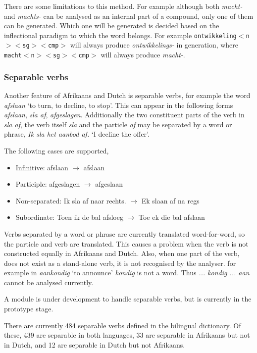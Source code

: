 \documentclass[11pt]{article}
\begin{document}
There are some limitations to this method. For example although
both {\em macht-} and {\em machts-} can be analysed as an internal part
of a compound, only one of them can be generated. Which one will be generated
is decided based on the inflectional paradigm to which the word belongs. For
example {\small {\tt ontwikkeling$<$n$><$sg$><$cmp$>$}} will always produce {\em ontwikkelings-} in generation,
where {\small {\tt macht$<$n$><$sg$><$cmp$>$}} will always produce {\em macht-}.

\subsubsection{Separable verbs}

Another feature of Afrikaans and Dutch is separable verbs, for example
the word {\em afslaan} `to turn, to decline, to stop'. This can appear in the following
forms {\em afslaan}, {\em sla af}, {\em afgeslagen}. Additionally the two constituent
parts of the verb in {\em sla af}, the verb itself {\em sla} and the particle
{\em af} may be separated by a word or phrase, {\em Ik sla het aanbod af.}
 `I decline the offer'.

The following cases are supported,

\begin{itemize}
\item Infinitive: afslaan $\rightarrow$ afslaan 
\item Participle: afgeslagen $\rightarrow$ afgeslaan
\item Non-separated: Ik sla af naar rechts. $\rightarrow$ Ek slaan af na regs
\item Subordinate: Toen ik de bal afsloeg $\rightarrow$ Toe ek die bal afslaan
\end{itemize}

Verbs separated by a word or phrase are currently translated word-for-word,
so the particle and verb are translated. This causes a problem when the
verb is not constructed equally in Afrikaans and Dutch. Also, when one part
of the verb, does not exist as a stand-alone verb, it is not recognised by the analyser.
for example in {\em aankondig} `to announce' {\em kondig} is not a word. Thus {\em ... kondig ... aan} 
cannot be analysed currently.

A module is under development to handle separable verbs, but is currently
in the prototype stage.

There are currently 484 separable verbs defined in the bilingual
dictionary. Of these, 439 are separable in both languages, 33 are
separable in Afrikaans but not in Dutch, and 12 are separable in
Dutch but not Afrikaans.
\end{document}
